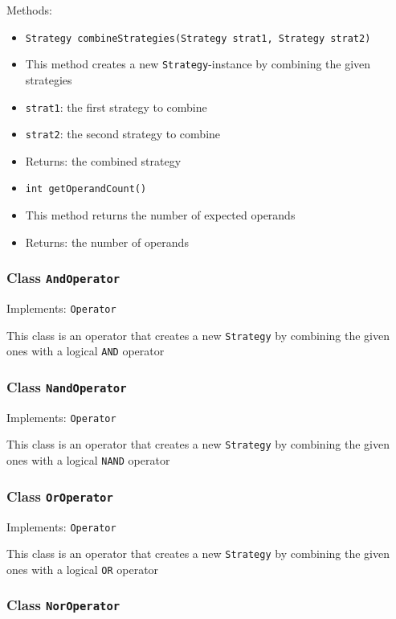 \documentclass[parskip=full,11pt]{scrartcl}
\begin{document}
Methods:
\begin{itemize}\itemsep -10pt
	\item \texttt{Strategy combineStrategies(Strategy strat1, Strategy strat2)}
	\item[] This method creates a new \texttt{Strategy}-instance by combining the given strategies
	\item[] \texttt{strat1}: the first strategy to combine
	\item[] \texttt{strat2}: the second strategy to combine
	\item[] Returns: the combined strategy

	\item \texttt{int getOperandCount()}
	\item[] This method returns the number of expected operands
	\item[] Returns: the number of operands
\end{itemize}

\subsubsection{Class \texttt{AndOperator}}

Implements: \texttt{Operator}

This class is an operator that creates a new \texttt{Strategy} by combining the given ones with a logical \texttt{AND} operator

\subsubsection{Class \texttt{NandOperator}}

Implements: \texttt{Operator}

This class is an operator that creates a new \texttt{Strategy} by combining the given ones with a logical \texttt{NAND} operator

\subsubsection{Class \texttt{OrOperator}}

Implements: \texttt{Operator}

This class is an operator that creates a new \texttt{Strategy} by combining the given ones with a logical \texttt{OR} operator

\subsubsection{Class \texttt{NorOperator}}
\end{document}
